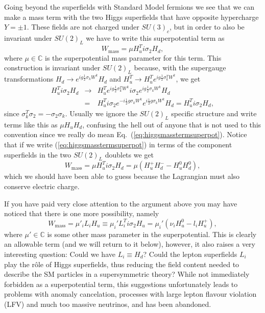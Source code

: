 \documentclass[notes.tex]{subfiles}
\begin{document}
Going beyond the superfields with Standard Model fermions we see that we can make a mass term with the two Higgs superfields that have opposite hypercharge $Y=\pm1$. These fields are not charged under $SU(3)_c$, but in order to also be invariant under $SU(2)_L$ we have to write this superpotential term as
\begin{equation}
W_\text{mass}=\mu H^T_ui\sigma_2 H_d,
\label{eq:higgsmasstermsuperpot}
\end{equation}
where $\mu\in\mathbb C$ is the superpotential mass parameter for this term. This construction is invariant under $SU(2)_L$ because, with the supergauge transformations $H_d \to e^{ig\frac{1}{2}\sigma_kW^k}H_d$ and $H^T_u \to H^T_u e^{ig\frac{1}{2}\sigma^T_kW^k}$, we get
\begin{eqnarray*}
H_u^T i\sigma_2 H_d &\to& H_u^T e^{ig\frac{1}{2}\sigma_k^TW^k}i\sigma_2 e^{ig\frac{1}{2}\sigma_k W^k}H_d\\
 &=& H_u^T i\sigma_2e^{-i\frac{1}{2}g\sigma_kW^k}e^{i\frac{1}{2}g\sigma_kW^k}H_d = H_u^T i\sigma_2 H_d,
\end{eqnarray*}
since $\sigma_k^T\sigma_2 = -\sigma_2\sigma_k$. Usually we ignore the $SU(2)_L$ specific structure and write terms like  this as $\mu H_u H_d$, confusing the hell out of anyone that is not used to this convention since we really do mean Eq.~(\ref{eq:higgsmasstermsuperpot}). Notice that if we write (\ref{eq:higgsmasstermsuperpot}) in terms of the component superfields in the two $SU(2)_L$ doublets we get
\[W_\text{mass}=\mu H_u^Ti\sigma_2 H_d = \mu (H_u^+ H_d^- - H_u^0 H_d^0),\]
which we should have been able to guess because the Lagrangian must also conserve electric charge.

If you have paid very close attention to the argument above you may have noticed that there is one more possibility, namely
\[W_\text{mass}=\mu'_i L_iH_u \equiv \mu_i' L_i^T i\sigma_2 H_u = \mu_i'(\nu_i H_u^0 - l_iH_u^+),\]
where $\mu'\in\mathbb C$ is some other mass parameter in the superpotential. This is clearly an allowable term (and we will return to it below), however, it also raises a very interesting question: Could we have $L_i\equiv H_d$? Could the lepton superfields $L_i$ play the r\^ole of Higgs superfields, thus reducing the field content needed to describe the SM particles in a supersymmetric theory? While not immediately forbidden as a superpotential term, this suggestions unfortunately leads to problems with anomaly cancelation, processes with large lepton flavour violation (LFV) and much too massive neutrinos, and has been abandoned.
\end{document}
